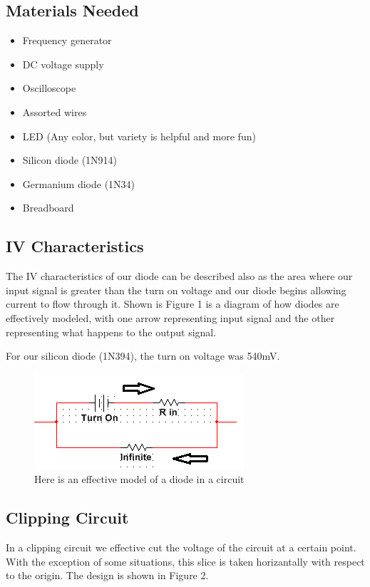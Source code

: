 \documentclass[a4paper]{article}
\begin{document}
\subsection{Materials Needed}

\begin{itemize}
\item Frequency generator 
\item DC voltage supply
\item Oscilloscope
\item Assorted wires
\item LED (Any color, but variety is helpful and more fun)
\item Silicon diode (1N914)
\item Germanium diode (1N34)
\item Breadboard
\end{itemize}

\subsection{IV Characteristics}

The IV characteristics of our diode can be described also as the area where our input signal is greater than the turn on voltage and our diode begins allowing current to flow through it.  Shown is Figure 1 is a diagram of how diodes are effectively modeled, with one arrow representing input signal and the other representing what happens to the output signal.

For our silicon diode (1N394), the turn on voltage was 540mV.

\begin{figure}
\centering
\includegraphics[width=.5\textwidth]{Diode_model.png}
\caption{\label{fig:Diode}Here is an effective model of a diode in a circuit}
\end{figure}

\subsection{Clipping Circuit}

In a clipping circuit we effective cut the voltage of the circuit at a certain point.  With the  exception of some situations, this slice is taken horizantally with respect to the origin.  The design is shown in Figure 2.
\end{document}
